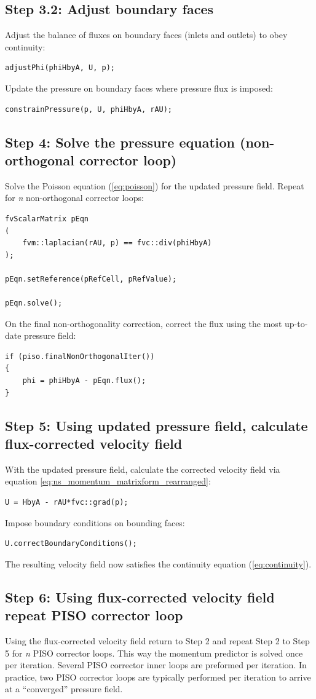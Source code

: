 \documentclass[a4paper,11pt]{report}
\begin{document}
\subsection*{Step 3.2: Adjust boundary faces}
Adjust the balance of fluxes on boundary faces (inlets and outlets) to obey continuity: 
\begin{verbatim}
adjustPhi(phiHbyA, U, p);
\end{verbatim}
Update the pressure on boundary faces where pressure flux is imposed:
\begin{verbatim}
constrainPressure(p, U, phiHbyA, rAU);
\end{verbatim}

\subsection*{Step 4: Solve the pressure equation (non-orthogonal corrector loop)}
Solve the Poisson equation (\ref{eq:poisson}) for the updated pressure field. Repeat for \textit{n} non-orthogonal corrector loops:
\begin{verbatim}
fvScalarMatrix pEqn
(
    fvm::laplacian(rAU, p) == fvc::div(phiHbyA)
);

pEqn.setReference(pRefCell, pRefValue);

pEqn.solve();
\end{verbatim}
On the final non-orthogonality correction, correct the flux using the most up-to-date pressure field:
\begin{verbatim}
if (piso.finalNonOrthogonalIter())
{
    phi = phiHbyA - pEqn.flux();
}
\end{verbatim}

\subsection*{Step 5: Using updated pressure field, calculate flux-corrected velocity field}
With the updated pressure field, calculate the corrected velocity field via equation \ref{eq:ns_momentum_matrixform_rearranged}:
\begin{verbatim}
U = HbyA - rAU*fvc::grad(p);
\end{verbatim}
Impose boundary conditions on bounding faces:
\begin{verbatim}
U.correctBoundaryConditions();
\end{verbatim}
The resulting velocity field now satisfies the continuity equation (\ref{eq:continuity}).

\subsection*{Step 6: Using flux-corrected velocity field repeat PISO corrector loop}
Using the flux-corrected velocity field return to Step 2 and repeat Step 2 to Step 5 for \textit{n} PISO corrector loops. This way the momentum predictor is solved once per iteration. Several PISO corrector inner loops are preformed per iteration. In practice, two PISO corrector loops are typically performed per iteration to arrive at a ``converged'' pressure field.
\end{document}
